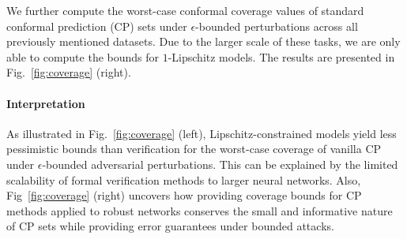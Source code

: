 We further compute the worst-case conformal coverage values of standard conformal prediction (CP) sets under \(\epsilon\)-bounded perturbations across all previously mentioned datasets. Due to the larger scale of these tasks, we are only able to compute the bounds for $1$-Lipschitz models. The results are presented in Fig.~\ref{fig:coverage} (right).

\paragraph{Interpretation} As illustrated in Fig.~\ref{fig:coverage} (left), Lipschitz-constrained models yield less pessimistic bounds than verification for the worst-case coverage of vanilla CP under \(\epsilon\)-bounded adversarial perturbations. This can be explained by the limited scalability of formal verification methods to larger neural networks. Also, Fig~\ref{fig:coverage} (right) uncovers how providing coverage bounds for CP methods applied to robust networks conserves the small and informative nature of CP sets while providing error guarantees under bounded attacks.